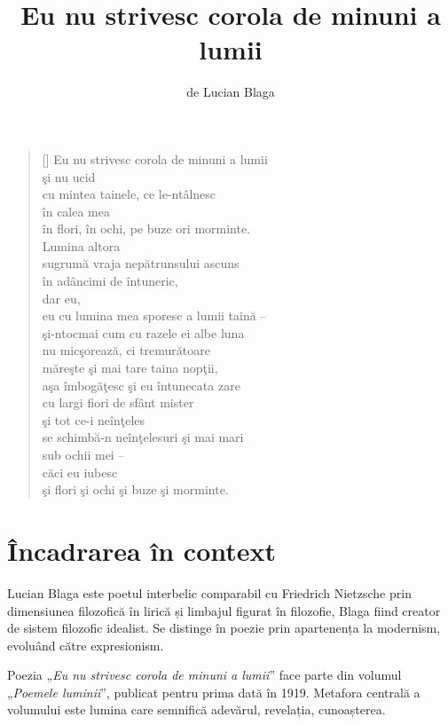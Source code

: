 \documentclass{article}
\title{Eu nu strivesc corola de minuni a lumii}
\author{de Lucian Blaga}
\date{}
\newcommand{\qu}[1]{„\emph{#1}”}
\begin{document}
\maketitle

\settowidth{\versewidth}{eu cu lumina mea sporesc a lumii taină --}
\begin{verse}[\versewidth]
Eu nu strivesc corola de minuni a lumii \\
şi nu ucid \\
cu mintea tainele, ce le-ntâlnesc \\
în calea mea \\
în flori, în ochi, pe buze ori morminte. \\
Lumina altora \\
sugrumă vraja nepătrunsului ascuns \\
în adâncimi de întuneric, \\
dar eu, \\
eu cu lumina mea sporesc a lumii taină -- \\
şi-ntocmai cum cu razele ei albe luna \\
nu micşorează, ci tremurătoare \\
măreşte şi mai tare taina nopţii, \\
aşa îmbogăţesc şi eu întunecata zare \\
cu largi fiori de sfânt mister \\
şi tot ce-i neînţeles \\
se schimbă-n neînţelesuri şi mai mari \\
sub ochii mei -- \\
căci eu iubesc \\
şi flori şi ochi şi buze şi morminte. \\
\end{verse}

\section{Încadrarea în context}
Lucian Blaga este poetul interbelic comparabil cu Friedrich Nietzsche prin dimensiunea filozofică în lirică și limbajul figurat în filozofie, Blaga fiind creator de sistem filozofic idealist. Se distinge în poezie prin apartenența la modernism, evoluând către expresionism.

Poezia \qu{Eu nu strivesc corola de minuni a lumii} face parte din volumul \qu{Poemele luminii}, publicat pentru prima dată în 1919. Metafora centrală a volumului este lumina care semnifică adevărul, revelația, cunoașterea.
\end{document}
